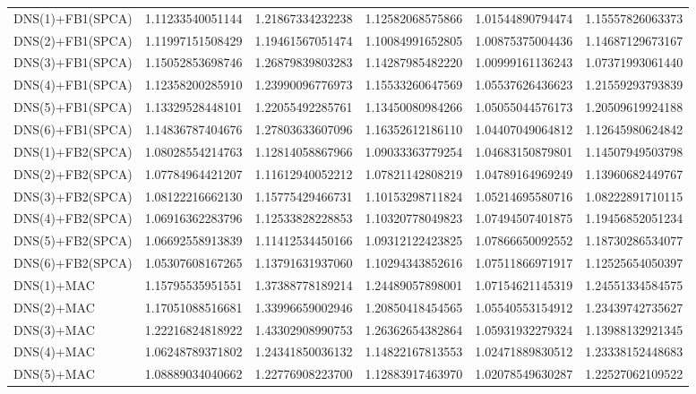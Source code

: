 \begin{table}[H]
\begin{adjustbox}{totalheight=\baselineskip}
\begin{tabular}{lSSSSS}
DNS(1)+FB1(SPCA) & 1.11233540051144 & 1.21867334232238 & 1.12582068575866 & 1.01544890794474 & 1.15557826063373 \\ 
DNS(2)+FB1(SPCA) & 1.11997151508429 & 1.19461567051474 & 1.10084991652805 & 1.00875375004436 & 1.14687129673167 \\ 
DNS(3)+FB1(SPCA) & 1.15052853698746 & 1.26879839803283 & 1.14287985482220 & 1.00999161136243 & 1.07371993061440 \\ 
DNS(4)+FB1(SPCA) & 1.12358200285910 & 1.23990096776973 & 1.15533260647569 & 1.05537626436623 & 1.21559293793839 \\ 
DNS(5)+FB1(SPCA) & 1.13329528448101 & 1.22055492285761 & 1.13450080984266 & 1.05055044576173 & 1.20509619924188 \\ 
DNS(6)+FB1(SPCA) & 1.14836787404676 & 1.27803633607096 & 1.16352612186110 & 1.04407049064812 & 1.12645980624842 \\ 
DNS(1)+FB2(SPCA) & 1.08028554214763 & 1.12814058867966 & 1.09033363779254 & 1.04683150879801 & 1.14507949503798 \\ 
DNS(2)+FB2(SPCA) & 1.07784964421207 & 1.11612940052212 & 1.07821142808219 & 1.04789164969249 & 1.13960682449767 \\ 
DNS(3)+FB2(SPCA) & 1.08122216662130 & 1.15775429466731 & 1.10153298711824 & 1.05214695580716 & 1.08222891710115 \\ 
DNS(4)+FB2(SPCA) & 1.06916362283796 & 1.12533828228853 & 1.10320778049823 & 1.07494507401875 & 1.19456852051234 \\ 
DNS(5)+FB2(SPCA) & 1.06692558913839 & 1.11412534450166 & 1.09312122423825 & 1.07866650092552 & 1.18730286534077 \\ 
DNS(6)+FB2(SPCA) & 1.05307608167265 & 1.13791631937060 & 1.10294343852616 & 1.07511866971917 & 1.12525654050397 \\ 
DNS(1)+MAC & 1.15795535951551 & 1.37388778189214 & 1.24489057898001 & 1.07154621145319 & 1.24551334584575 \\ 
DNS(2)+MAC & 1.17051088516681 & 1.33996659002946 & 1.20850418454565 & 1.05540553154912 & 1.23439742735627 \\ 
DNS(3)+MAC & 1.22216824818922 & 1.43302908990753 & 1.26362654382864 & 1.05931932279324 & 1.13988132921345 \\ 
DNS(4)+MAC & 1.06248789371802 & 1.24341850036132 & 1.14822167813553 & 1.02471889830512 & 1.23338152448683 \\ 
DNS(5)+MAC & 1.08889034040662 & 1.22776908223700 & 1.12883917463970 & 1.02078549630287 & 1.22527062109522 \\ 

\end{tabular}
\end{adjustbox}
\end{table}
